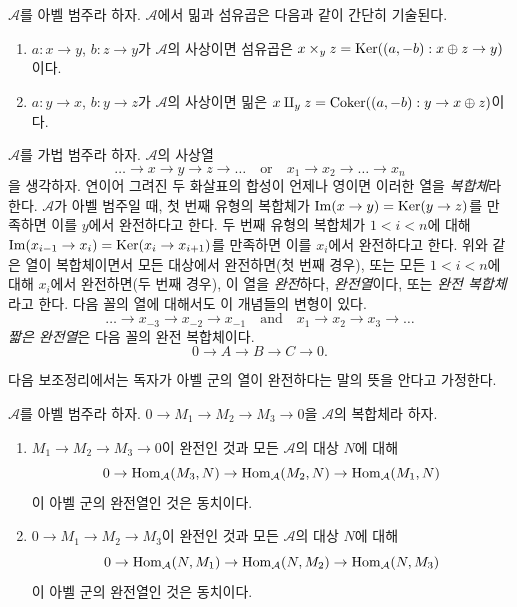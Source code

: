 \begin{example}
\label{example-fibre-product-pushouts}
$\mathcal{A}$를 아벨 범주라 하자. $\mathcal{A}$에서 밂과 섬유곱은 다음과
같이 간단히 기술된다.
\begin{enumerate}
\item $a : x \to y$, $b : z \to y$가 $\mathcal{A}$의 사상이면 섬유곱은
$x \times_y z = \mathop{\mathrm{Ker}}((a, -b) : x \oplus z \to y)$이다.
\item $a : y \to x$, $b : y \to z$가 $\mathcal{A}$의 사상이면 밂은
$x \amalg_y z = \mathop{\mathrm{Coker}}((a, -b) : y \to x \oplus z)$이다.
\end{enumerate}
\end{example}

\begin{definition}
\label{definition-exact}
$\mathcal{A}$를 가법 범주라 하자. $\mathcal{A}$의 사상열
$$
\ldots \to x \to y \to z \to \ldots
\quad\text{or}\quad
x_1 \to x_2 \to \ldots \to x_n
$$
을 생각하자. 연이어 그려진 두 화살표의 합성이 언제나 영이면 이러한 열을
{\it 복합체}라 한다. $\mathcal{A}$가 아벨 범주일 때, 첫 번째 유형의
복합체가 $\mathop{\mathrm{Im}}(x \to y) = \mathop{\mathrm{Ker}}(y \to z)$를 만족하면 이를
{$y$에서 완전}하다고 한다. 두 번째 유형의 복합체가 $1 < i < n$에 대해
$\mathop{\mathrm{Im}}(x_{i - 1} \to x_i) = \mathop{\mathrm{Ker}}(x_i \to x_{i + 1})$를 만족하면 이를
{$x_i$에서 완전}하다고 한다.
위와 같은 열이 복합체이면서 모든 대상에서 완전하면(첫 번째 경우), 또는
모든 $1 < i < n$에 대해 $x_i$에서 완전하면(두 번째 경우), 이 열을
{\it 완전}하다, {\it 완전열}이다, 또는 {\it 완전 복합체}라고 한다.
다음 꼴의 열에 대해서도 이 개념들의 변형이 있다.
$$
\ldots \to x_{-3} \to x_{-2} \to x_{-1}
\quad\text{and}\quad
x_1 \to x_2 \to x_3 \to \ldots
$$
{\it 짧은 완전열}은 다음 꼴의 완전 복합체이다.
$$
0 \to A  \to B \to C \to 0.
$$
\end{definition}

\noindent
다음 보조정리에서는 독자가 아벨 군의 열이 완전하다는 말의 뜻을 안다고
가정한다.

\begin{lemma}
\label{lemma-check-exactness}
$\mathcal{A}$를 아벨 범주라 하자.
$0 \to M_1 \to M_2 \to M_3 \to 0$을 $\mathcal{A}$의 복합체라 하자.
\begin{enumerate}
\item $M_1 \to M_2 \to M_3 \to 0$이 완전인 것과 모든 $\mathcal{A}$의
대상 $N$에 대해
$$
0 \to \mathop{\mathrm{Hom}}\nolimits_\mathcal{A}(M_3, N) \to
\mathop{\mathrm{Hom}}\nolimits_\mathcal{A}(M_2, N) \to \mathop{\mathrm{Hom}}\nolimits_\mathcal{A}(M_1, N)
$$
이 아벨 군의 완전열인 것은 동치이다.
\item $0 \to M_1 \to M_2 \to M_3$이 완전인 것과 모든 $\mathcal{A}$의
대상 $N$에 대해
$$
0 \to \mathop{\mathrm{Hom}}\nolimits_\mathcal{A}(N, M_1) \to \mathop{\mathrm{Hom}}\nolimits_\mathcal{A}(N, M_2) \to
\mathop{\mathrm{Hom}}\nolimits_\mathcal{A}(N, M_3)
$$
이 아벨 군의 완전열인 것은 동치이다.
\end{enumerate}
\end{lemma}

